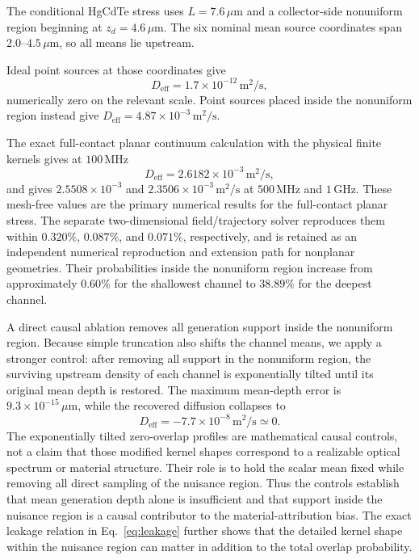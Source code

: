 \documentclass[aps,pra,twocolumn,superscriptaddress,nofootinbib]{revtex4-2}
\newcommand{\Deff}{D_{\mathrm{eff}}}
\begin{document}
The conditional HgCdTe stress uses $L=7.6\,\mu\mathrm{m}$ and a collector-side nonuniform region beginning at $z_d=4.6\,\mu\mathrm{m}$. The six nominal mean source coordinates span $2.0$--$4.5\,\mu\mathrm{m}$, so all means lie upstream.

Ideal point sources at those coordinates give
\begin{equation}
\Deff=1.7\times10^{-12}\,\mathrm{m^2/s},
\end{equation}
numerically zero on the relevant scale. Point sources placed inside the nonuniform region instead give $\Deff=4.87\times10^{-3}\,\mathrm{m^2/s}$.

The exact full-contact planar continuum calculation with the physical finite kernels gives at $100\,\mathrm{MHz}$
\begin{equation}
\Deff=2.6182\times10^{-3}\,\mathrm{m^2/s},
\label{eq:hgcdteD}
\end{equation}
and gives $2.5508\times10^{-3}$ and $2.3506\times10^{-3}\,\mathrm{m^2/s}$ at $500\,\mathrm{MHz}$ and $1\,\mathrm{GHz}$. These mesh-free values are the primary numerical results for the full-contact planar stress. The separate two-dimensional field/trajectory solver reproduces them within $0.320\%$, $0.087\%$, and $0.071\%$, respectively, and is retained as an independent numerical reproduction and extension path for nonplanar geometries.
Their probabilities inside the nonuniform region increase from approximately $0.60\%$ for the shallowest channel to $38.89\%$ for the deepest channel.

A direct causal ablation removes all generation support inside the nonuniform region. Because simple truncation also shifts the channel means, we apply a stronger control: after removing all support in the nonuniform region, the surviving upstream density of each channel is exponentially tilted until its original mean depth is restored. The maximum mean-depth error is $9.3\times10^{-15}\,\mu\mathrm{m}$, while the recovered diffusion collapses to
\begin{equation}
\Deff=-7.7\times10^{-8}\,\mathrm{m^2/s}\simeq0.
\end{equation}
The exponentially tilted zero-overlap profiles are mathematical causal controls, not a claim that those modified kernel shapes correspond to a realizable optical spectrum or material structure.  Their role is to hold the scalar mean fixed while removing all direct sampling of the nuisance region.
Thus the controls establish that mean generation depth alone is insufficient and that support inside the nuisance region is a causal contributor to the material-attribution bias.  The exact leakage relation in Eq.~\eqref{eq:leakage} further shows that the detailed kernel shape within the nuisance region can matter in addition to the total overlap probability.
\end{document}
